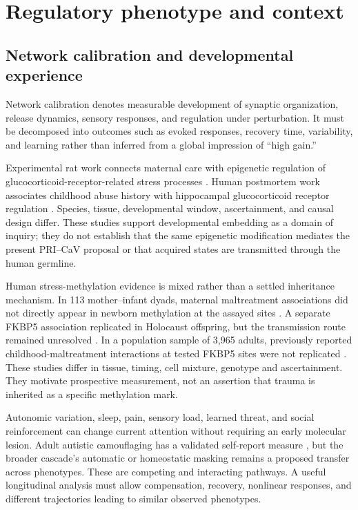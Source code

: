 \section{Regulatory phenotype and context}

\subsection{Network calibration and developmental experience}

Network calibration denotes measurable development of synaptic organization, release dynamics, sensory responses, and regulation under perturbation. It must be decomposed into outcomes such as evoked responses, recovery time, variability, and learning rather than inferred from a global impression of “high gain.”

Experimental rat work connects maternal care with epigenetic regulation of glucocorticoid-receptor-related stress processes \cite{ref14}. Human postmortem work associates childhood abuse history with hippocampal glucocorticoid receptor regulation \cite{ref15}. Species, tissue, developmental window, ascertainment, and causal design differ. These studies support developmental embedding as a domain of inquiry; they do not establish that the same epigenetic modification mediates the present PRI–CaV proposal or that acquired states are transmitted through the human germline.

Human stress-methylation evidence is mixed rather than a settled inheritance mechanism. In 113 mother–infant dyads, maternal maltreatment associations did not directly appear in newborn methylation at the assayed sites \cite{ref25}. A separate FKBP5 association replicated in Holocaust offspring, but the transmission route remained unresolved \cite{ref26}. In a population sample of 3,965 adults, previously reported childhood-maltreatment interactions at tested FKBP5 sites were not replicated \cite{ref34}. These studies differ in tissue, timing, cell mixture, genotype and ascertainment. They motivate prospective measurement, not an assertion that trauma is inherited as a specific methylation mark.

Autonomic variation, sleep, pain, sensory load, learned threat, and social reinforcement can change current attention without requiring an early molecular lesion. Adult autistic camouflaging has a validated self-report measure \cite{ref32}, but the broader cascade’s automatic or homeostatic masking remains a proposed transfer across phenotypes. These are competing and interacting pathways. A useful longitudinal analysis must allow compensation, recovery, nonlinear responses, and different trajectories leading to similar observed phenotypes.


